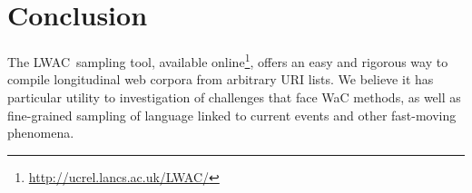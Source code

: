 \documentclass[11pt]{article}
\newcommand{\toolname}{LWAC}
\begin{document}



\section{Conclusion}
The \toolname~sampling tool, available online\footnote{\url{http://ucrel.lancs.ac.uk/LWAC/}}, offers an easy and rigorous way to compile longitudinal web corpora from arbitrary URI lists.  We believe it has particular utility to investigation of challenges that face WaC methods, as well as fine-grained sampling of language linked to current events and other fast-moving phenomena.

\vspace{-12pt}



\end{document}
